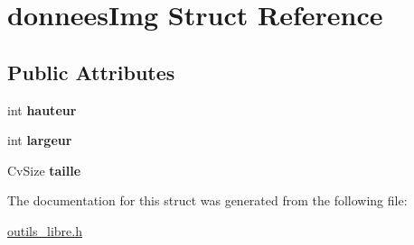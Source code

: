 \hypertarget{structdonneesImg}{\section{donnees\-Img Struct Reference}
\label{structdonneesImg}
}
\subsection*{Public Attributes}
\begin{DoxyCompactItemize}
\item 
\hypertarget{structdonneesImg_aaeecaf2b85d5d21f80fcbc9369f84b40}{int {\bfseries hauteur}}\label{structdonneesImg_aaeecaf2b85d5d21f80fcbc9369f84b40}

\item 
\hypertarget{structdonneesImg_aac90cc090e5b2f4bbf136fb7ad53b88f}{int {\bfseries largeur}}\label{structdonneesImg_aac90cc090e5b2f4bbf136fb7ad53b88f}

\item 
\hypertarget{structdonneesImg_aaae8951bd6883e4361908edceeb17837}{Cv\-Size {\bfseries taille}}\label{structdonneesImg_aaae8951bd6883e4361908edceeb17837}

\end{DoxyCompactItemize}


The documentation for this struct was generated from the following file\-:\begin{DoxyCompactItemize}
\item 
\hyperlink{outils__libre_8h}{outils\-\_\-libre.\-h}\end{DoxyCompactItemize}

